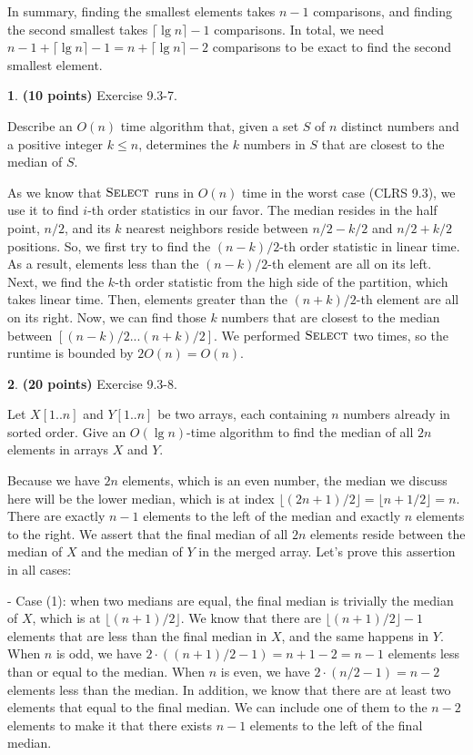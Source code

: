 \documentclass[11pt]{article}
\theoremstyle{definition}
\theoremstyle{theorem}
\newtheorem{prob}{}
\newcommand{\solution}{\medskip\noindent{\color{DarkBlue}\textbf{Solution:}}}
\begin{document}
In summary, finding the smallest elements takes $n-1$ comparisons, and finding the second smallest takes $\lceil \lg n \rceil - 1$ comparisons. In total, we need $n - 1 + \lceil \lg n \rceil - 1 = n +  \lceil \lg n \rceil - 2$ comparisons to be exact to find the second smallest element.


\newpage
\begin{prob} \textbf{(10 points)} Exercise 9.3-7.
\end{prob}
Describe an $O(n)$ time algorithm that, given a set $S$ of $n$ distinct numbers and a positive integer $k \le n$, determines the $k$ numbers in $S$ that are closest to the median of $S$.

\solution

As we know that $\textproc{\textsc{Select}}$ runs in $O(n)$ time in the worst case (CLRS 9.3), we use it to find $i$-th order statistics in our favor. The median resides in the half point, $n/2$, and its $k$ nearest neighbors reside between $n/2 - k/2$ and $n/2 + k/2$ positions. So, we first try to find the $(n-k)/2$-th order statistic in linear time. As a result, elements less than the $(n-k)/2$-th element are all on its left. Next, we find the $k$-th order statistic from the high side of the partition, which takes linear time. Then, elements greater than the $(n+k)/2$-th element are all on its right. Now, we can find those $k$ numbers that are closest to the median between $[(n-k)/2 ... (n+k)/2]$. We performed $\textproc{\textsc{Select}}$ two times, so the runtime is bounded by $2O(n) = O(n)$.


\newpage
\begin{prob} \textbf{(20 points)} Exercise 9.3-8.
\end{prob}
Let $X[1..n]$ and $Y[1..n]$ be two arrays, each containing $n$ numbers already in sorted order. Give an $O(\lg n)$-time algorithm to find the median of all $2n$ elements in arrays $X$ and $Y$.

\solution

Because we have $2n$ elements, which is an even number, the median we discuss here will be the lower median, which is at index $\lfloor (2n+1)/2 \rfloor = \lfloor n + 1/2 \rfloor = n$. There are exactly $n-1$ elements to the left of the median and exactly $n$ elements to the right. We assert that the final median of all $2n$ elements reside between the median of $X$ and the median of $Y$ in the merged array. Let's prove this assertion in all cases:

- Case (1): when two medians are equal, the final median is trivially the median of $X$, which is at $\lfloor(n+1)/2 \rfloor$. We know that there are $\lfloor(n+1)/2 \rfloor - 1$ elements that are less than the final median in $X$, and the same happens in $Y$. When $n$ is odd, we have $2 \cdot ((n+1)/2 - 1) = n + 1 - 2 = n - 1$ elements less than or equal to the median. When $n$ is even, we have $2 \cdot (n/2 - 1) = n - 2$ elements less than the median. In addition, we know that there are at least two elements that equal to the final median. We can include one of them to the $n-2$ elements to make it that there exists $n-1$ elements to the left of the final median.
\end{document}
